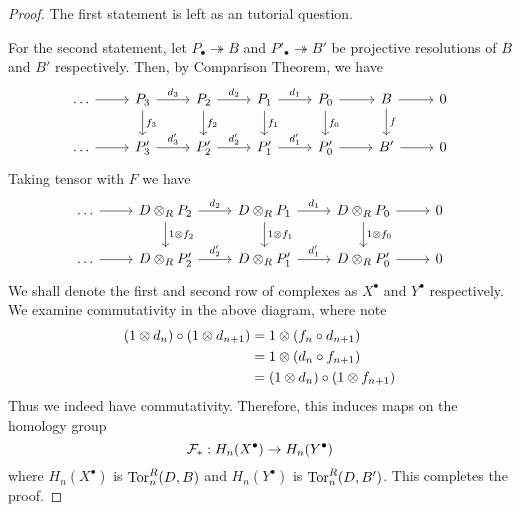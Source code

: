 \begin{proof}
    The first statement is left as an tutorial question.

    For the second statement, let $P_\bullet \twoheadrightarrow B$ and $P'_\bullet \twoheadrightarrow B'$ be projective resolutions of $B$ and $B'$ respectively. Then, by Comparison Theorem, we have
    \[\begin{tikzcd}[sep=small]
	\dots && {P_3} && {P_2} && {P_1} && {P_0} && B && 0 \\
	\\
	\dots && {P_3'} && {P_2'} && {P_1'} && {P_0'} && {B'} && 0
	\arrow[from=1-1, to=1-3]
	\arrow["{d_3}", from=1-3, to=1-5]
	\arrow["{f_3}", from=1-3, to=3-3]
	\arrow["{d_2}", from=1-5, to=1-7]
	\arrow["{f_2}", from=1-5, to=3-5]
	\arrow["{d_1}", from=1-7, to=1-9]
	\arrow["{f_1}", from=1-7, to=3-7]
	\arrow[from=1-9, to=1-11]
	\arrow["{f_0}", from=1-9, to=3-9]
	\arrow[from=1-11, to=1-13]
	\arrow["f", from=1-11, to=3-11]
	\arrow[from=3-1, to=3-3]
	\arrow["{d_3'}", from=3-3, to=3-5]
	\arrow["{d_2'}", from=3-5, to=3-7]
	\arrow["{d_1'}", from=3-7, to=3-9]
	\arrow[from=3-9, to=3-11]
	\arrow[from=3-11, to=3-13]
    \end{tikzcd}\]
    Taking tensor with $F$ we have 
    \[\begin{tikzcd}[sep=small]
	\dots && {D \ten_R P_2} && {D \ten_R P_1} && {D \ten_R P_0} && 0 \\
	\\
	\dots && {D \ten_R P_2'} && {D \ten_R P_1'} && {D \ten_R P_0'} && 0
	\arrow[from=1-1, to=1-3]
	\arrow["{d_2}", from=1-3, to=1-5]
	\arrow["{1\ten f_2}", from=1-3, to=3-3]
	\arrow["{d_1}", from=1-5, to=1-7]
	\arrow["{1\ten f_1}", from=1-5, to=3-5]
	\arrow[from=1-7, to=1-9]
	\arrow["{1\ten f_0}", from=1-7, to=3-7]
	\arrow[from=3-1, to=3-3]
	\arrow["{d_2'}", from=3-3, to=3-5]
	\arrow["{d_1'}", from=3-5, to=3-7]
	\arrow[from=3-7, to=3-9]
    \end{tikzcd}\]
    We shall denote the first and second row of complexes as $X^\bullet$ and $Y^\bullet$ respectively. We examine commutativity in the above diagram, where note
    \begin{align*}
        (1\otimes d_n) \circ (1\otimes d_{n+1}) 
        &= 1\otimes (f_n \circ d_{n+1}) \\
        &= 1\otimes (d_n\circ f_{n+1}) \\
        &= (1\otimes d_n) \circ (1\otimes f_{n+1})
    \end{align*}
    Thus we indeed have commutativity. Therefore, this induces maps on the homology group
    \[\mathcal F_* :H_n(X^\bullet) \to H_n(Y^\bullet)\]
    where $H_n(X^\bullet)$ is $\operatorname{Tor}_n^R(D,B)$ and $H_n(Y^\bullet)$ is $\operatorname{Tor}_n^R(D,B')$. This completes the proof.
\end{proof}

